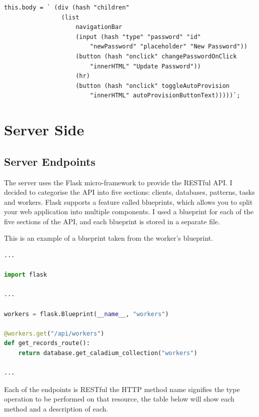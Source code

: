 \begin{lstlisting}
this.body = ` (div (hash "children"
                (list
                    navigationBar
                    (input (hash "type" "password" "id"
                        "newPassword" "placeholder" "New Password"))
                    (button (hash "onclick" changePasswordOnClick
                        "innerHTML" "Update Password"))
                    (hr)
                    (button (hash "onclick" toggleAutoProvision
                        "innerHTML" autoProvisionButtonText)))))`;
\end{lstlisting}

\section{Server Side}

\subsection{Server Endpoints}
The server uses the Flask micro-framework to provide the RESTful API.
I decided to categorise the API into five sections:
clients, databases, patterns, tasks and workers.
Flask supports a feature called blueprints,
which allows you to split your web application into multiple components.
I used a blueprint for each of the five sections of the API,
and each blueprint is stored in a separate file.

This is an example of a blueprint taken from the worker's blueprint.
\begin{lstlisting}[language=python]
...

import flask

...

workers = flask.Blueprint(__name__, "workers")

@workers.get("/api/workers")
def get_records_route():
    return database.get_caladium_collection("workers")

...
\end{lstlisting}

Each of the endpoints is RESTful the HTTP method name signifies the type operation to be performed on that resource, the table below will show each method and a description of each.

